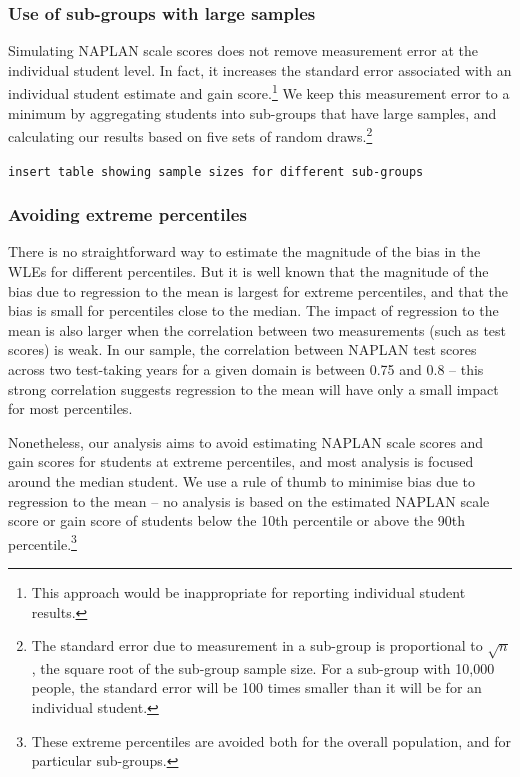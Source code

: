 \subsubsection*{Use of sub-groups with large samples}

Simulating NAPLAN scale scores does not remove measurement error at the individual student level. In fact, it increases the standard error associated with an individual student estimate and gain score.\footnote{This approach would be inappropriate for reporting individual student results.} We keep this measurement error to a minimum by aggregating students into sub-groups that have large samples, and calculating our results based on five sets of random draws.\footnote{The standard error due to measurement in a sub-group is proportional to $\sqrt{n}$, the square root of the sub-group sample size. For a sub-group with 10,000 people, the standard error will be 100 times smaller than it will be for an individual student.}

\verb+insert table showing sample sizes for different sub-groups+

\subsubsection*{Avoiding extreme percentiles}

There is no straightforward way to estimate the magnitude of the bias in the WLEs for different percentiles. But it is well known that the magnitude of the bias due to regression to the mean is largest for extreme percentiles, and that the bias is small for percentiles close to the median. The impact of regression to the mean is also larger when the correlation between two measurements (such as test scores) is weak. In our sample, the correlation between NAPLAN test scores across two test-taking years for a given domain is between 0.75 and 0.8 -- this strong correlation suggests regression to the mean will have only a small impact for most percentiles.

Nonetheless, our analysis aims to avoid estimating NAPLAN scale scores and gain scores for students at extreme percentiles, and most analysis is focused around the median student. We use a rule of thumb to minimise bias due to regression to the mean -- no analysis is based on the estimated NAPLAN scale score or gain score of students below the 10th percentile or above the 90th percentile.\footnote{These extreme percentiles are avoided both for the overall population, and for particular sub-groups.}

